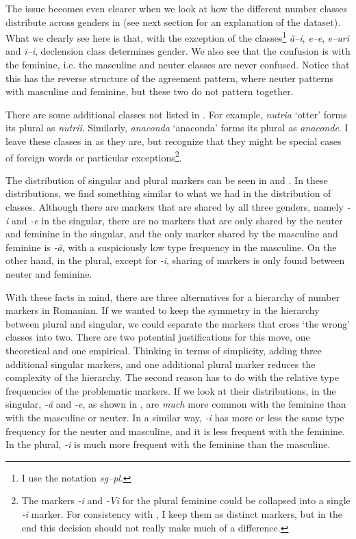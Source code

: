 The issue becomes even clearer when we look at how the different number classes distribute across genders in  (see next section for an explanation of the dataset). What we clearly see here is that, with the exception of the classes\footnote{I use the notation \textit{sg--pl}.} \textit{ă--i}, \textit{e--e}, \textit{e--uri} and \textit{i--i}, declension class determines gender. We also see that the confusion is with the feminine, i.e. the masculine and neuter classes are never confused. Notice that this has the reverse structure of the agreement pattern, where neuter patterns with masculine and feminine, but these two do not pattern together.


There are some additional classes not listed in \textcite{Cojocaru.2003}. For example, \textit{nutria} `otter' forms its plural as \textit{nutrii}. Similarly, \textit{anaconda} `anaconda' forms its plural as \textit{anaconde}. I leave these classes in as they are, but recognize that they might be special cases of foreign words or particular exceptions\footnote{The markers \textit{-i} and \textit{-Vi} for the plural feminine could be collapsed into a single \textit{-i} marker. For consistency with \textcite{Cojocaru.2003}, I keep them as distinct markers, but in the end this decision should not really make much of a difference.}.

The distribution of singular and plural markers can be seen in  and . In these distributions, we find something similar to what we had in the distribution of classes. Although there are markers that are shared by all three genders, namely \textit{-i} and \textit{-e} in the singular, there are no markers that are only shared by the neuter and feminine in the singular, and the only marker shared by the masculine and feminine is \textit{-ă}, with a suspiciously low type frequency in the masculine. On the other hand, in the plural, except for \textit{-i}, sharing of markers is only found between neuter and feminine.

With these facts in mind, there are three alternatives for a hierarchy of number markers in Romanian. If we wanted to keep the symmetry in the hierarchy between plural and singular, we could separate the markers that cross `the wrong' classes into two. There are two potential justifications for this move, one theoretical and one empirical. Thinking in terms of simplicity, adding three additional singular markers, and one additional plural marker reduces the complexity of the hierarchy. The second reason has to do with the relative type frequencies of the problematic markers. If we look at their distributions, in the singular, \textit{-ă} and \textit{-e}, as shown in , are \textit{much} more common with the feminine than with the masculine or neuter. In a similar way, \textit{-i} has more or less the same type frequency for the neuter and masculine, and it is less frequent with the feminine. In the plural, \textit{-i} is much more frequent with the feminine than the masculine.

